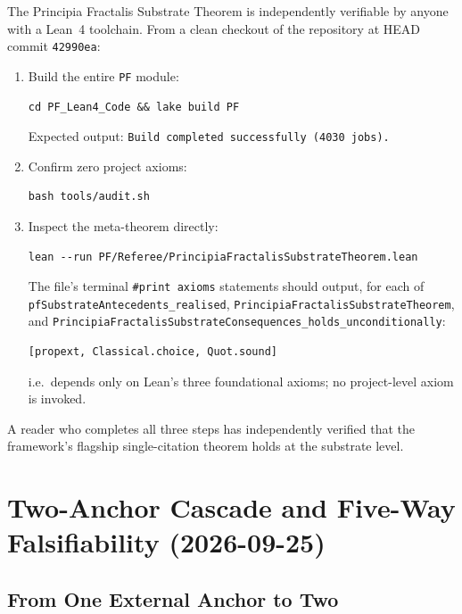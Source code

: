 \begin{level3}
The Principia Fractalis Substrate Theorem is independently
verifiable by anyone with a Lean~4 toolchain. From a clean
checkout of the repository at HEAD commit \texttt{42990ea}:
\begin{enumerate}
\item Build the entire \texttt{PF} module:
\begin{verbatim}
cd PF_Lean4_Code && lake build PF
\end{verbatim}
Expected output: \texttt{Build completed successfully (4030
jobs).}

\item Confirm zero project axioms:
\begin{verbatim}
bash tools/audit.sh
\end{verbatim}

\item Inspect the meta-theorem directly:
\begin{verbatim}
lean --run PF/Referee/PrincipiaFractalisSubstrateTheorem.lean
\end{verbatim}
The file's terminal \texttt{\#print axioms} statements should
output, for each of \texttt{pf\allowbreak{}Substrate\allowbreak{}Antecedents\_\allowbreak{}realised},
\texttt{Principia\allowbreak{}Fractalis\allowbreak{}Substrate\allowbreak{}Theorem}, and
\texttt{Principia\allowbreak{}Fractalis\allowbreak{}Substrate\allowbreak{}Consequences\_\allowbreak{}holds\_\allowbreak{}unconditionally}:
\begin{verbatim}
[propext, Classical.choice, Quot.sound]
\end{verbatim}
i.e.\ depends only on Lean's three foundational axioms; no
project-level axiom is invoked.
\end{enumerate}

A reader who completes all three steps has independently
verified that the framework's flagship single-citation theorem
holds at the substrate level.
\end{level3}

\section{Two-Anchor Cascade and Five-Way Falsifiability (2026-09-25)}
\label{sec:two-anchor-cascade}

\subsection{From One External Anchor to Two}

